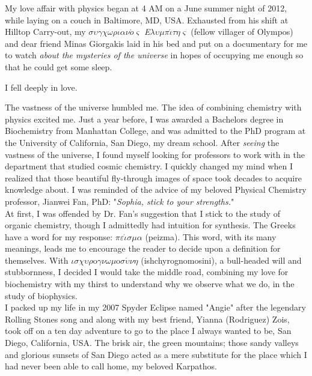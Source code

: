 \documentclass[12pt]{ucsddissertation}
\newcommand\tab[1][1cm]{\hspace*{#1}}
\begin{document}
\begin{preface}
My love affair with physics began at 4 AM on a June summer night of 2012, while laying on a couch in Baltimore, MD, USA.  Exhausted from his shift at Hilltop Carry-out, my $\sigma\upsilon\gamma\chi\omega\rho\iota\alpha\nu\acute{o}\varsigma$ \textit{E}$\lambda\upsilon\mu\pi\acute{\iota}\tau\eta\varsigma$ (fellow villager of Olympos) and dear friend Minas Giorgakis laid in his bed and put on a documentary for me to watch  \textit{about the mysteries of the universe} in hopes of occupying me enough so that he could get some sleep.  
\begin{center}
I fell deeply in love. 
\end{center}
\tab[0.7cm] The vastness of the universe humbled me. The idea of combining chemistry with physics excited me. Just a year before, I was awarded a Bachelors degree in Biochemistry from Manhattan College, and was admitted to the PhD program at the University of California, San Diego, my dream school. After \textit{seeing} the vastness of the universe, I found myself looking for professors to work with in the department that studied cosmic chemistry. I quickly changed my mind when I realized that those beautiful fly-through images of space took decades to acquire knowledge about. I was reminded of the advice of my beloved Physical Chemistry professor, Jianwei Fan, PhD: "\textit{Sophia, stick to your strengths.}"\\
\tab[0.7cm]At first, I was offended by Dr. Fan's suggestion that I stick to the study of organic chemistry, though I admittedly had intuition for synthesis. The Greeks have a word for my response: $\pi\varepsilon\acute{\iota}\sigma\mu\alpha$ (peizma). This word, with its many meanings, leads me to encourage the reader to decide upon a definition for themselves. With $\iota\sigma\chi\upsilon\rho$o$\gamma\nu\omega\mu$o$\sigma\acute{\upsilon}\nu\eta$ (ishchyrognomosini), a bull-headed will and stubbornness, I decided I would take the middle road, combining my love for biochemistry with my thirst to understand why we observe what we do, in the study of biophysics.\\
\tab[0.7cm]I packed up my life in my 2007 Spyder Eclipse named "Angie" after the legendary Rolling Stones song and along with my best friend, Yianna (Rodriguez) Zois, took off on a ten day adventure to go to the place I always wanted to be, San Diego, California, USA. The brisk air, the green mountains; those sandy valleys and glorious sunsets of San Diego acted as a mere substitute for the place which I had never been able to call home, my beloved Karpathos.\\

\end{preface}
\end{document}
